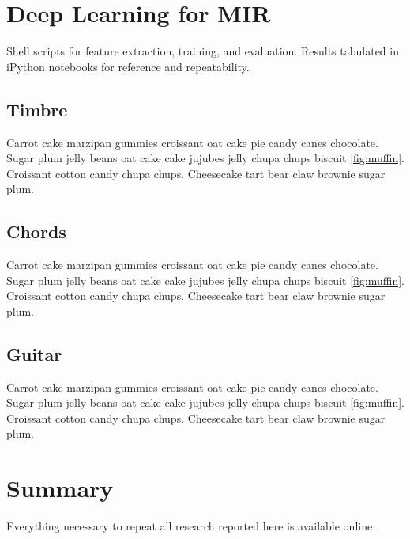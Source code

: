\section{Deep Learning for MIR}
\label{sec:dl4mir}

Shell scripts for feature extraction, training, and evaluation.
Results tabulated in iPython notebooks for reference and repeatability.

\subsection{Timbre}

Carrot cake marzipan gummies croissant oat cake pie candy canes chocolate.
Sugar plum jelly beans oat cake cake jujubes jelly chupa chups biscuit \ref{fig:muffin}.
Croissant cotton candy chupa chups.
Cheesecake tart bear claw brownie sugar plum.

\subsection{Chords}

Carrot cake marzipan gummies croissant oat cake pie candy canes chocolate.
Sugar plum jelly beans oat cake cake jujubes jelly chupa chups biscuit \ref{fig:muffin}.
Croissant cotton candy chupa chups.
Cheesecake tart bear claw brownie sugar plum.


\subsection{Guitar}

Carrot cake marzipan gummies croissant oat cake pie candy canes chocolate.
Sugar plum jelly beans oat cake cake jujubes jelly chupa chups biscuit \ref{fig:muffin}.
Croissant cotton candy chupa chups.
Cheesecake tart bear claw brownie sugar plum.


\section{Summary}
\label{sec:summary}

Everything necessary to repeat all research reported here is available online.
